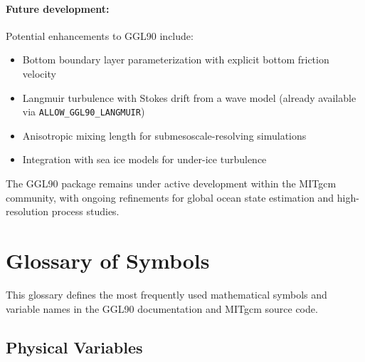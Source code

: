 \documentclass[12pt,letterpaper]{article}
\begin{document}
\paragraph{Future development:} Potential enhancements to GGL90 include:
\begin{itemize}
\item Bottom boundary layer parameterization with explicit bottom friction velocity
\item Langmuir turbulence with Stokes drift from a wave model (already available via \verb|ALLOW_GGL90_LANGMUIR|)
\item Anisotropic mixing length for submesoscale-resolving simulations
\item Integration with sea ice models for under-ice turbulence
\end{itemize}

The GGL90 package remains under active development within the MITgcm community, with ongoing refinements for global ocean state estimation and high-resolution process studies.



\section{Glossary of Symbols}
\label{app:glossary}

This glossary defines the most frequently used mathematical symbols and variable names in the GGL90 documentation and MITgcm source code.

\subsection*{Physical Variables}
\end{document}
